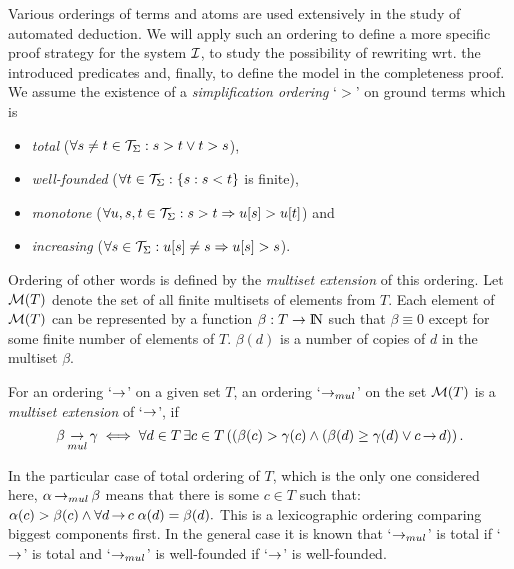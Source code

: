 Various orderings of terms and atoms are used extensively in the study of 
automated deduction. We will apply such an ordering to define a more specific
proof strategy for the system $\mbox {$\cal I$}$, to study the possibility of rewriting
wrt. the introduced predicates and, finally, to define the model in the
completeness proof. We assume the existence of 
a {\em simplification ordering} `$>$' \cite{Der} on ground terms which is
\begin{itemize}\MyLPar
\item {\em total} (\(\forall s\not=t\in{\cal T}_\Sigma : s>t\lor t>s\)), 
\item {\em well-founded} (\(\forall t\in{\cal T}_\Sigma : \{s:s<t\}\) is finite), 
\item {\em monotone} (\(\forall u,s,t\in{\cal T}_\Sigma :s>t\Rightarrow u[s]>u[t]\)) 
and 
\item {\em increasing} (\(\forall s\in{\cal T}_\Sigma : u[s]\not= s \Rightarrow u[s]>s\)).
\end{itemize}
Ordering of other words is defined by the {\em multiset extension} \cite{DM} of this
ordering.
Let
${\cal M}(T)$ denote the set of all finite multisets of elements from $T$. Each
element of ${\cal M}(T)$ can be represented by a function \(\beta:T\to {{\rm I\!N}}\)
such that \(\beta\equiv 0\) except for some finite number of elements of $T$.
\(\beta(d)\) is a number of copies of $d$ in the multiset $\beta$.
\begin{DEFINITION} \label{def:multiset-ordering}
For an ordering `$\mathop{\rightarrow}$' on a given set $T$, an ordering `\(\mathop{\mathop{\mathop{\rightarrow}}_{mul}}\)' on the
set \({\cal M}(T)\) is a {\em multiset extension} of `$\mathop{\rightarrow}$', if
\[\beta\mathop{\mathop{\mathop{\rightarrow}}_{mul}}\gamma\iff\forall d\in  T\,\exists c\in T\/ \left((\beta(c)>\gamma(c)
\land (\beta(d)\geq \gamma(d) \lor c\mathop{\rightarrow} d)\right).\]
\end{DEFINITION}
In the particular case of total ordering of $T$,
which is the only one considered here, \(\alpha\mathop{\mathop{\mathop{\rightarrow}}_{mul}}\beta\) 
means that there is some $c\in T$ such that:
\(\alpha(c)>\beta(c)\land \forall d\mathop{\rightarrow} c\; \alpha(d)=\beta(d).\)
This is a lexicographic ordering comparing biggest components first. In the
general case it is known \cite{DM} that `$\mathop{\mathop{\mathop{\rightarrow}}_{mul}}$' is total if `$\mathop{\rightarrow}$' is
total and `$\mathop{\mathop{\mathop{\rightarrow}}_{mul}}$' is well-founded if `$\mathop{\rightarrow}$' is well-founded.

